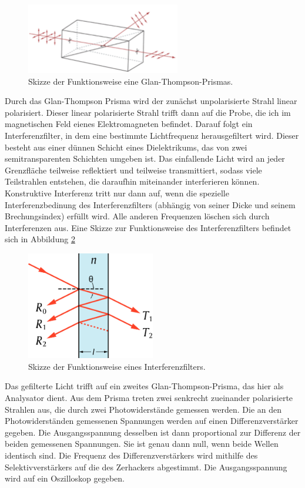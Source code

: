 \begin{figure}
  \centering
  \includegraphics[width=0.6\textwidth]{data/glanthompson.png}
  \caption{Skizze der Funktionsweise eine Glan-Thompson-Prismas. \cite{gt}}
  \label{fig:gt}
\end{figure}

Durch das Glan-Thompson Prisma wird der zunächst unpolarisierte Strahl linear
polarisiert. Dieser linear polarisierte Strahl trifft dann auf die Probe, die ich
im magnetischen Feld eienes Elektromagneten befindet. Darauf folgt ein Interferenzfilter,
in dem eine bestimmte Lichtfrequenz herausgefiltert wird. Dieser besteht aus einer dünnen
Schicht eines Dielektrikums, das von zwei semitransparenten Schichten umgeben ist.
Das einfallende Licht wird an jeder Grenzfläche teilweise reflektiert und teilweise
transmittiert, sodass viele Teilstrahlen entstehen, die daraufhin miteinander
interferieren können. Konstruktive Interferenz tritt nur dann auf, wenn die spezielle
Interferenzbedinung des Interferenzfilters (abhängig von seiner Dicke und seinem Brechungsindex)
erfüllt wird. Alle anderen Frequenzen löschen sich durch Interferenzen aus. Eine Skizze
zur Funktionsweise des Interferenzfilters befindet sich in Abbildung \ref{fig:if}

\begin{figure}
  \centering
  \includegraphics[width=0.5\textwidth]{data/if.png}
  \caption{Skizze der Funktionsweise eines Interferenzfilters. \cite{wiki2}}
  \label{fig:if}
\end{figure}

Das gefilterte Licht trifft auf ein zweites Glan-Thompson-Prisma, das hier als Analysator dient.
Aus dem Prisma treten zwei senkrecht zueinander polarisierte Strahlen aus, die durch zwei
Photowiderstände gemessen werden. Die an den Photowiderständen
gemessenen Spannungen werden auf einen Differenzverstärker gegeben. Die Ausgangsspannung
desselben ist dann proportional zur Differenz der beiden gemessenen Spannungen. Sie
ist genau dann null, wenn beide Wellen identisch sind. Die Frequenz des Differenzverstärkers
wird  mithilfe des Selektivverstärkers auf die des Zerhackers abgestimmt. Die Ausgangsspannung
wird auf ein Oszilloskop gegeben.

